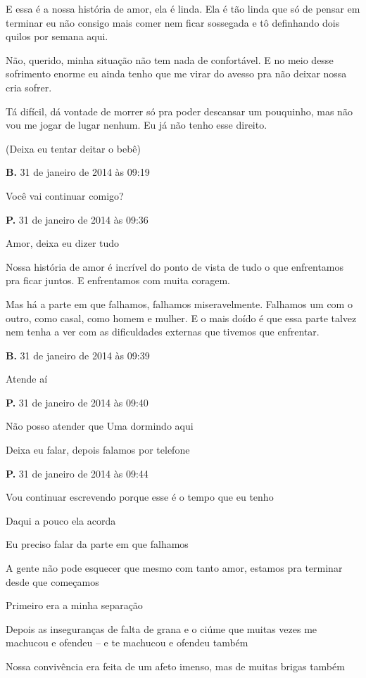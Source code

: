 {E essa é a nossa história de amor, ela é linda. Ela é tão linda que só
de pensar em terminar eu não consigo mais comer nem ficar sossegada e tô
definhando dois quilos por semana aqui.

Não, querido, minha situação não tem nada de confortável. E no meio
desse sofrimento enorme eu ainda tenho que me virar do avesso pra não
deixar nossa cria sofrer.

Tá difícil, dá vontade de morrer só pra poder descansar um pouquinho,
mas não vou me jogar de lugar nenhum. Eu já não tenho esse direito.

(Deixa eu tentar deitar o bebê)

\textbf{B.} 31 de janeiro de 2014 às 09:19

Você vai continuar comigo?

\textbf{P.} 31 de janeiro de 2014 às 09:36

Amor, deixa eu dizer tudo

Nossa história de amor é incrível do ponto de vista de tudo o que
enfrentamos pra ficar juntos. E enfrentamos com muita coragem.

Mas há a parte em que falhamos, falhamos miseravelmente. Falhamos um com
o outro, como casal, como homem e mulher. E o mais doído é que essa
parte talvez nem tenha a ver com as dificuldades externas que tivemos
que enfrentar.

\textbf{B.} 31 de janeiro de 2014 às 09:39

Atende aí

\textbf{P.} 31 de janeiro de 2014 às 09:40

Não posso atender que Uma dormindo aqui

Deixa eu falar, depois falamos por telefone

\textbf{P.} 31 de janeiro de 2014 às 09:44

Vou continuar escrevendo porque esse é o tempo que eu tenho

Daqui a pouco ela acorda

Eu preciso falar da parte em que falhamos

A gente não pode esquecer que mesmo com tanto amor, estamos pra terminar
desde que começamos

Primeiro era a minha separação

Depois as inseguranças de falta de grana e o ciúme que muitas vezes me
machucou e ofendeu -- e te machucou e ofendeu também

Nossa convivência era feita de um afeto imenso, mas de muitas brigas
também

}
